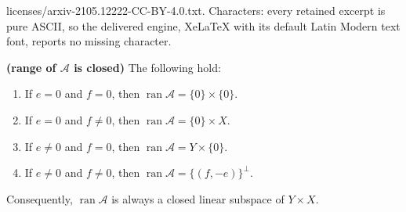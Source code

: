 \documentclass[10pt,a4paper]{amsart}
\providecommand{\mA}{\mathcal{A}}
\newcommand{\ran}{\ensuremath{\operatorname{ran}}}
\begin{document}
licenses/arxiv-2105.12222-CC-BY-4.0.txt. Characters: every retained excerpt is pure ASCII, so the delivered engine, XeLaTeX with its default Latin Modern text font, reports no missing character.
\begin{proposition}\textbf{(range of $\mA$ is closed)}
\label{p:therange}
The following hold:
\begin{enumerate}
\item 
\label{p:therange00}
If $e=0$ and $f=0$,  then 
$\ran\mA = \{0\}\times\{0\}$.
\item
\label{p:therange01}
If $e=0$ and $f\neq 0$, then 
$\ran\mA = \{0\}\times X$.
\item
\label{p:therange10}
If $e\neq 0$ and $f=0$, then 
$\ran\mA = Y\times \{0\}$. 
\item
\label{p:therange11}
If $e\neq 0$ and $f\neq 0$, then 
$\ran\mA = \{(f,-e)\}^\perp$. 
\end{enumerate}
Consequently, $\ran\mA$ is always 
a closed linear subspace of $Y\times X$. 
\end{proposition}
\end{document}
